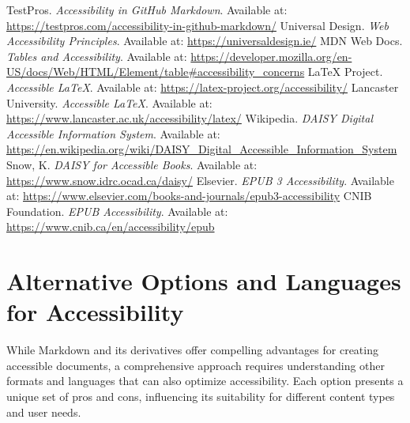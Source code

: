 \begin{thebibliography}{99}
 TestPros. \textit{Accessibility in GitHub Markdown}. Available at: \url{https://testpros.com/accessibility-in-github-markdown/}
 Universal Design. \textit{Web Accessibility Principles}. Available at: \url{https://universaldesign.ie/}
 MDN Web Docs. \textit{Tables and Accessibility}. Available at: \url{https://developer.mozilla.org/en-US/docs/Web/HTML/Element/table#accessibility_concerns}
 LaTeX Project. \textit{Accessible LaTeX}. Available at: \url{https://latex-project.org/accessibility/}
 Lancaster University. \textit{Accessible LaTeX}. Available at: \url{https://www.lancaster.ac.uk/accessibility/latex/}
 Wikipedia. \textit{DAISY Digital Accessible Information System}. Available at: \url{https://en.wikipedia.org/wiki/DAISY_Digital_Accessible_Information_System}
 Snow, K. \textit{DAISY for Accessible Books}. Available at: \url{https://www.snow.idrc.ocad.ca/daisy/}
 Elsevier. \textit{EPUB 3 Accessibility}. Available at: \url{https://www.elsevier.com/books-and-journals/epub3-accessibility}
 CNIB Foundation. \textit{EPUB Accessibility}. Available at: \url{https://www.cnib.ca/en/accessibility/epub}
\end{thebibliography}

\section{Alternative Options and Languages for Accessibility}
\label{sec:alt-options-accessibility}

While Markdown and its derivatives offer compelling advantages for creating accessible documents, a comprehensive approach requires understanding other formats and languages that can also optimize accessibility. Each option presents a unique set of pros and cons, influencing its suitability for different content types and user needs.

